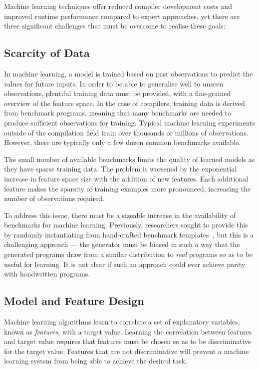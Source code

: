 Machine learning techniques offer reduced compiler development costs and improved runtime performance compared to expert approaches, yet there are three significant challenges that must be overcome to realise these goals:

\subsection{Scarcity of Data}
\label{subsec:challenge-scarcity}

In machine learning, a model is trained based on past observations to predict the values for future inputs. In order to be able to generalise well to unseen observations, plentiful training data must be provided, with a fine-grained overview of the feature space. In the case of compilers, training data is derived from benchmark programs, meaning that many benchmarks are needed to produce sufficient observations for training. Typical machine learning experiments outside of the compilation field train over thousands or millions of observations. However, there are typically only a few dozen common benchmarks available.

The small number of available benchmarks limits the quality of learned models as they have sparse training data. The problem is worsened by the exponential increase in feature space size with the addition of new features. Each additional feature makes the sparsity of training examples more pronounced, increasing the number of observations required.

To address this issue, there must be a sizeable increase in the availability of benchmarks for machine learning. Previously, researchers sought to provide this by randomly instantiating from hand-crafted benchmark templates~\cite{Chiu2015}, but this is a challenging approach --- the generator must be biased in such a way that the generated programs draw from a similar distribution to \emph{real} programs so as to be useful for learning. It is not clear if such an approach could ever achieve parity with handwritten programs.

\subsection{Model and Feature Design}
\label{subsec:challenge-features}

Machine learning algorithms learn to correlate a set of explanatory variables, known as \emph{features}, with a target value. Learning the correlation between features and target value requires that features must be chosen so as to be discriminative for the target value. Features that are not discriminative will prevent a machine learning system from being able to achieve the desired task.

